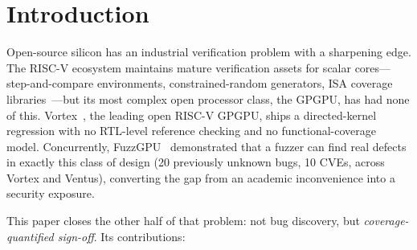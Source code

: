 \documentclass[review,12pt]{elsarticle}
\begin{document}

\section{Introduction}
\label{sec:intro}
Open-source silicon has an industrial verification problem with a
sharpening edge. The RISC-V ecosystem maintains mature verification
assets for scalar cores---step-and-compare environments,
constrained-random generators, ISA coverage
libraries~\cite{corevverif,riscvdv,rvvi,imperasdv,difftest,opentitan}---but
its most complex open processor class, the GPGPU, has had none of
this. Vortex~\cite{vortex-micro,vortex-carrv}, the leading open
RISC-V GPGPU, ships a directed-kernel regression with no RTL-level
reference checking and no functional-coverage model. Concurrently,
FuzzGPU~\cite{fuzzgpu} demonstrated that a fuzzer can find real
defects in exactly this class of design (20 previously unknown bugs,
10 CVEs, across Vortex and Ventus), converting the gap from an
academic inconvenience into a security exposure.

This paper closes the other half of that problem: not bug discovery,
but \emph{coverage-quantified sign-off}. Its contributions:
\end{document}
